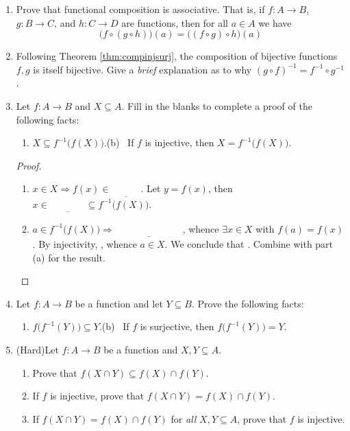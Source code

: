 \begin{exercises}
\begin{enumerate}
	  
		\item Prove that functional composition is associative. That is, if $f:A\to B$, $g:B\to C$, and $h:C\to D$ are functions, then for all $a\in A$ we have
			\[
				\bigl(f\circ(g\circ h)\bigr)(a) = \bigl((f\circ g)\circ h\bigr)(a)
			\]
	  
	  \item Following Theorem \ref{thm:compinjsurj}, the composition of bijective functions $f,g$ is itself bijective. Give a \emph{brief} explanation as to why $(g\circ f)^{-1}=f^{-1}\circ g^{-1}$.
	
		
		\item Let $f:A\to B$ and $X\subseteq A$. Fill in the blanks to complete a proof of the following facts:
		\begin{enumerate}
	  	\item $X\subseteq f^{-1}\bigl(f(X)\bigr)$.\qquad\qquad\qquad (b) \ If $f$ is injective, then $X=f^{-1}\bigl(f(X)\bigr)$.
		\end{enumerate}
		\begin{proof}
			\begin{enumerate}
		  	\item $x\in X\Longrightarrow f(x)\in \underline{\phantom{f(X)}}$. Let $y=f(x)$, then $x\in \underline{\phantom{f^{-1}\bigl(\{y\}\bigr)}} \subseteq f^{-1}\bigl(f(X)\bigr)$.
		  	\item $a\in f^{-1}\bigl(f(X)\bigr) \Longrightarrow \underline{\phantom{f(a)\in f(X)}}$, whence $\exists x\in X$ with $f(a)=f(x)$. By injectivity, \underline{\phantom{$x=a$}}, whence $a\in X$. We conclude that \underline{}. Combine with part (a) for the result.\qedhere
			\end{enumerate}
		\end{proof}
		
	
		\item Let $f:A\to B$ be a function and let $Y\subseteq B$. Prove the following facts:
		\begin{enumerate}
	    \item $f\bigl(f^{-1}(Y)\bigr) \subseteq Y$.\qquad\qquad\qquad (b) \ If $f$ is surjective, then $f\bigl(f^{-1}(Y)\bigr)=Y$.
		\end{enumerate}
	  
	
	
		\item (Hard)\lstsp Let $f:A\to B$ be a function and $X,Y\subseteq A$.
		\begin{enumerate}
		  \item Prove that $f(X\cap Y)\subseteq f(X)\cap f(Y)$.
		  \item If $f$ is injective, prove that $f(X\cap Y) = f(X) \cap f(Y)$.
		  \item If $f(X\cap Y)=f(X)\cap f(Y)$ for \emph{all} $X,Y\subseteq A$, prove that $f$ is injective.
		\end{enumerate}
		
	\end{enumerate}

\end{exercises}

